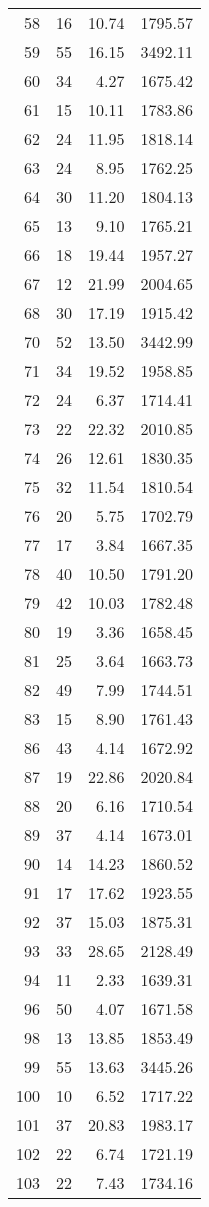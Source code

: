 \begin{appendix}
\begin{longtable}{rrrr}
58 & 16 & 10.74 & 1795.57 \\
59 & 55 & 16.15 & 3492.11 \\
60 & 34 & 4.27 & 1675.42 \\
61 & 15 & 10.11 & 1783.86 \\
62 & 24 & 11.95 & 1818.14 \\
63 & 24 & 8.95 & 1762.25 \\
64 & 30 & 11.20 & 1804.13 \\
65 & 13 & 9.10 & 1765.21 \\
66 & 18 & 19.44 & 1957.27 \\
67 & 12 & 21.99 & 2004.65 \\
68 & 30 & 17.19 & 1915.42 \\
70 & 52 & 13.50 & 3442.99 \\
71 & 34 & 19.52 & 1958.85 \\
72 & 24 & 6.37 & 1714.41 \\
73 & 22 & 22.32 & 2010.85 \\
74 & 26 & 12.61 & 1830.35 \\
75 & 32 & 11.54 & 1810.54 \\
76 & 20 & 5.75 & 1702.79 \\
77 & 17 & 3.84 & 1667.35 \\
78 & 40 & 10.50 & 1791.20 \\
79 & 42 & 10.03 & 1782.48 \\
80 & 19 & 3.36 & 1658.45 \\
81 & 25 & 3.64 & 1663.73 \\
82 & 49 & 7.99 & 1744.51 \\
83 & 15 & 8.90 & 1761.43 \\
86 & 43 & 4.14 & 1672.92 \\
87 & 19 & 22.86 & 2020.84 \\
88 & 20 & 6.16 & 1710.54 \\
89 & 37 & 4.14 & 1673.01 \\
90 & 14 & 14.23 & 1860.52 \\
91 & 17 & 17.62 & 1923.55 \\
92 & 37 & 15.03 & 1875.31 \\
93 & 33 & 28.65 & 2128.49 \\
94 & 11 & 2.33 & 1639.31 \\
96 & 50 & 4.07 & 1671.58 \\
98 & 13 & 13.85 & 1853.49 \\
99 & 55 & 13.63 & 3445.26 \\
100 & 10 & 6.52 & 1717.22 \\
101 & 37 & 20.83 & 1983.17 \\
102 & 22 & 6.74 & 1721.19 \\
103 & 22 & 7.43 & 1734.16 \\
\bottomrule
\end{longtable}


\end{appendix}
